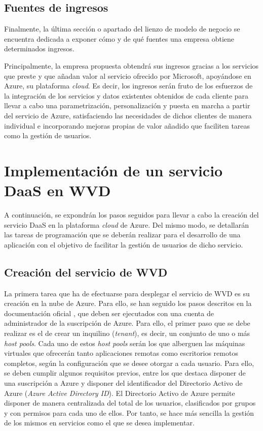 \subsection{Fuentes de ingresos}
Finalmente, la última sección o apartado del lienzo de modelo de negocio se encuentra dedicada a exponer cómo y de qué fuentes una empresa obtiene determinados ingresos.

Principalmente, la empresa propuesta obtendrá sus ingresos gracias a los servicios que preste y que añadan valor al servicio ofrecido por Microsoft, apoyándose en Azure, su plataforma \textit{cloud}. Es decir, los ingresos serán fruto de los esfuerzos de la integración de los servicios y datos existentes obtenidos de cada cliente para llevar a cabo una parametrización, personalización y puesta en marcha a partir del servicio de Azure, satisfaciendo las necesidades de dichos clientes de manera individual e incorporando mejoras propias de valor añadido que faciliten tareas como la gestión de usuarios.





\clearpage

\section{Implementación de un servicio \acs{DaaS} en \acs{WVD}}
A continuación, se expondrán los pasos seguidos para llevar a cabo la creación del servicio \acs{DaaS} en la plataforma \textit{cloud} de Azure. Del mismo modo, se detallarán las tareas de programación que se deberán realizar para el desarrollo de una aplicación con el objetivo de facilitar la gestión de usuarios de dicho servicio.

\subsection{Creación del servicio de \acs{WVD}}
La primera tarea que ha de efectuarse para desplegar el servicio de \acs{WVD} es su creación en la nube de Azure. Para ello, se han seguido los pasos descritos en la documentación oficial \cite{microsofttutowvd}, que deben ser ejecutados con una cuenta de administrador de la suscripción de Azure. Para ello, el primer paso que se debe realizar es el de crear un inquilino (\textit{tenant}), es decir, un conjunto de uno o más \textit{host pools}. Cada uno de estos \textit{host pools} serán los que alberguen las máquinas virtuales que ofrecerán tanto aplicaciones remotas como escritorios remotos completos, según la configuración que se desee otorgar a cada usuario. Para ello, se deben cumplir algunos requisitos previos, entre los que destaca disponer de una suscripción a Azure y disponer del identificador del Directorio Activo de Azure (\textit{Azure Active Directory ID}). El Directorio Activo de Azure permite disponer de manera centralizada del total de los usuarios, clasificados por grupos y con permisos para cada uno de ellos. Por tanto, se hace más sencilla la gestión de los mismos en servicios como el que se desea implementar.

